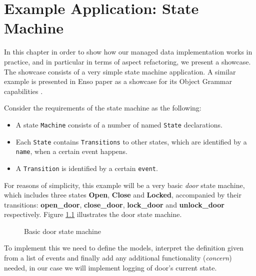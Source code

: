
\chapter{Example Application: State Machine}\label{Example Application}
In this chapter in order to show how our managed data implementation works in practice, and in particular in terms of aspect refactoring, we present a showcase.
The showcase consists of a very simple state machine application.
A similar example is presented in Enso paper as a showcase for its Object Grammar capabilities \cite{storm2012object}.

Consider the requirements of the state machine as the following: 
\begin{itemize}
	\item A state \texttt{Machine} consists of a number of named \texttt{State} declarations.

	\item Each \texttt{State} contains \texttt{Transitions} to other states, which are identified by a \texttt{name}, when a certain event happens.

	\item A \texttt{Transition} is identified by a certain \texttt{event}.
\end{itemize}

For reasons of simplicity, this example will be a very basic \textit{door} state machine, which includes three states \textbf{Open}, \textbf{Close} and \textbf{Locked}, accompanied by their transitions: \textbf{open\_door}, \textbf{close\_door}, \textbf{lock\_door} and \textbf{unlock\_door} respectively.
Figure \ref{fig:State_machine} illustrates the door state machine.

\begin{figure}[H]
	\centering
  	\caption{Basic door state machine}
  	\label{fig:State_machine}
\end{figure}

To implement this we need to define the models, interpret the definition given from a list of events and finally add any additional functionality (\textit{concern}) needed, in our case we will implement logging of door's current state.

